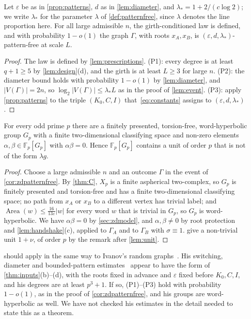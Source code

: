 \documentclass[11pt]{article}
\theoremstyle{definition}
\theoremstyle{plain}
\newcommand{\F}{\mathbb{F}}
\newcommand{\eps}{\varepsilon}
\newcommand{\Area}{\operatorname{Area}}
\begin{document}
\begin{corollary}\label{cor:zdpatternfree}
Let $\eps$ be as in \cref{prop:patterns}, $d$ as in \cref{lem:diameter}, and $\lambda_*=1+2/(c\log2)$; we write $\lambda_*$ for the parameter $\lambda$ of \cref{def:patternfree}, since $\lambda$ denotes the line proportion here. For all large admissible $n$, the girth-conditioned law is defined, and with probability $1-o(1)$ the graph $\Gamma$, with roots $x_A,x_B$, is $(\eps,d,\lambda_*)$-pattern-free at scale $L$.
\end{corollary}

\begin{proof}
The law is defined by \cref{lem:prescriptions}. (P1): every degree is at least $q+1\ge5$ by \cref{lem:design}(d), and the girth is at least $L\ge3$ for large $n$. (P2): the diameter bound holds with probability $1-o(1)$ by \cref{lem:diameter}, and $|V(\Gamma)|=2n$, so $\log_2|V(\Gamma)|\le\lambda_*L$ as in the proof of \cref{lem:event}. (P3): apply \cref{prop:patterns} to the triple $(K_0,C,I)$ that~\eqref{eq:constants} assigns to $(\eps,d,\lambda_*)$.
\end{proof}

\begin{proposition}\label{thm:D}
For every odd prime $p$ there are a finitely presented, torsion-free, word-hyperbolic group $G_p$ with a finite two-dimensional classifying space and non-zero elements $\alpha,\beta\in\F_p[G_p]$ with $\alpha\beta=0$. Hence $\F_p[G_p]$ contains a unit of order $p$ that is not of the form $\lambda g$.
\end{proposition}

\begin{proof}
Choose a large admissible $n$ and an outcome $\Gamma$ in the event of \cref{cor:zdpatternfree}. By \cref{thm:C}, $X_p$ is a finite aspherical two-complex, so $G_p$ is finitely presented and torsion-free and has a finite two-dimensional classifying space; no path from $x_A$ or $x_B$ to a different vertex has trivial label; and $\Area(w)\le\frac{16}{13\eps}|w|$ for every word $w$ that is trivial in $G_p$, so $G_p$ is word-hyperbolic. We have $\alpha\beta=0$ by \cref{sec:zdmodel}, and $\alpha,\beta\neq0$ by root protection and \cref{lem:handshake}(c), applied to $\Gamma_A$ and to $\Gamma_B$ with $\sigma\equiv1$.  give a non-trivial unit $1+\nu$, of order $p$ by the remark after \cref{lem:unit}.
\end{proof}

\begin{remark}\label{rem:ivanovhyp}
 should apply in the same way to Ivanov's random graphs~\cite[Construction~4.1]{Ivanov2026}. His switching, diameter and bounded-pattern estimates~\cite[Lemmas~4.2 and~4.4, Prop.~6.1]{Ivanov2026} appear to have the form of \cref{thm:inputs}(b)--(d), with the roots fixed in advance and $\eps$ fixed before $K_0,C,I$, and his degrees are at least $p^3+1$. If so, (P1)--(P3) hold with probability $1-o(1)$, as in the proof of \cref{cor:zdpatternfree}, and his groups are word-hyperbolic as well. We have not checked his estimates in the detail needed to state this as a theorem.
\end{remark}
\end{document}
